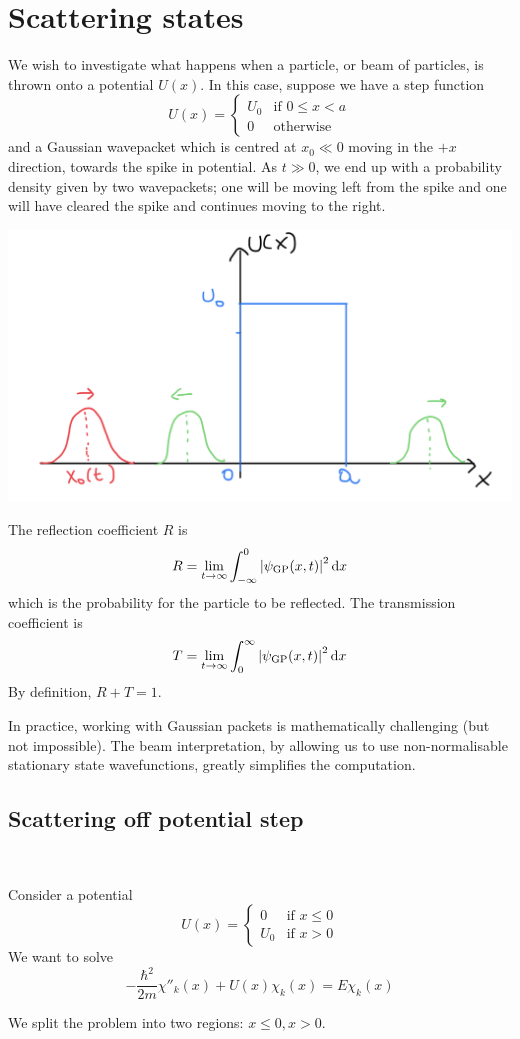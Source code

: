 \documentclass[a4paper]{article}
\begin{document}
\section{Scattering states}
We wish to investigate what happens when a particle, or beam of particles, is thrown onto a potential \( U(x) \).
In this case, suppose we have a step function
\[
	U(x) = \begin{cases} U_0 & \text{if } 0 \leq x < a \\
              0   & \text{otherwise}\end{cases}
\]
and a Gaussian wavepacket which is centred at \( x_0 \ll 0 \) moving in the \( +x \) direction, towards the spike in potential.
As \( t \gg 0 \), we end up with a probability density given by two wavepackets; one will be moving left from the spike and one will have cleared the spike and continues moving to the right.
\begin{center}
    \includegraphics[scale=0.17]{qm10.png}
\end{center}
\begin{definition}
	The reflection coefficient \( R \) is
	\[
		R = \lim_{t \to \infty} \int_{-\infty}^0 \abs{\psi_{\text{GP}}(x,t)}^2 \,\mathrm{d}{x}
	\]
	which is the probability for the particle to be reflected.
	The transmission coefficient is
	\[
		T = \lim_{t \to \infty} \int_0^\infty \abs{\psi_{\text{GP}}(x,t)}^2 \,\mathrm{d}{x}
	\]
	By definition, \( R + T = 1 \).
\end{definition}
In practice, working with Gaussian packets is mathematically challenging (but not impossible).
The beam interpretation, by allowing us to use non-normalisable stationary state wavefunctions, greatly simplifies the computation.

\subsection{Scattering off potential step}\ \vspace{-1.5em}
\begin{example}
    Consider a potential
\[
	U(x) =
	\begin{cases}
		0   & \text{if } x \leq 0 \\
		U_0 & \text{if } x > 0
	\end{cases}
\]
We want to solve
\[
	-\frac{\hbar^2}{2m} \chi''_k(x) + U(x) \chi_k(x) = E\chi_k(x)
\]
\end{example}
We split the problem into two regions: \( x \leq 0, x > 0 \).
\end{document}
